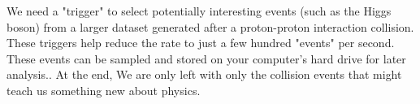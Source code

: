We need a "trigger" to select  potentially interesting events (such as the Higgs boson) from a larger dataset generated after a proton-proton interaction collision. These triggers help reduce the rate to just a few hundred "events" per second. These events can be sampled and stored on your computer's hard drive for later analysis.\cite{CMS_5}. At the end, We are only left with only the collision events that might teach us something new about physics.\\ 



